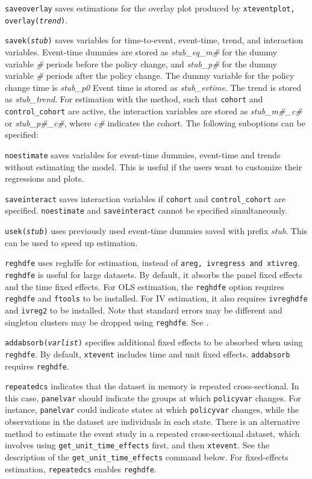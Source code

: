 \documentclass[bib]{./sty/statapress}
\begin{document}
\morehangpara
{\tt saveoverlay} saves estimations for the overlay plot produced by
            {\tt xteventplot, overlay({\it trend})}.

\hangpara
{\tt savek({\it stub})} saves variables for time-to-event, event-time, trend, and interaction variables.
Event-time dummies are stored as {\it stub\_eq\_m\#} for the dummy variable {\it \#} periods before the policy change, and {\it stub\_p\#} for the dummy variable {\it \#} periods after the policy change.
The dummy variable for the policy change time is {\it stub\_p0}
 Event time is stored as {\it stub\_evtime}. The trend is stored as {\it stub\_trend}.
For estimation with the \citet{sun2021estimating} method, such that {\tt cohort} and {\tt control\_cohort} are active, the interaction variables are stored as {\it stub\_m\#\_c\#} or {\it stub\_p\#\_c\#}, where {\it c\#} indicates the cohort.
The following suboptions can be specified:

\morehangpara
{\tt noestimate} saves variables for event-time dummies, event-time and trends without estimating the model. This is useful if the users want to customize their regressions and plots.

\morehangpara
{\tt saveinteract} saves interaction variables if {\tt cohort} and {\tt control\_cohort} are specified. {\tt noestimate} and {\tt saveinteract} cannot be specified simultaneously.

\hangpara
{\tt usek({\it stub})} uses previously used event-time dummies saved with prefix {\it stub}. This can be used to speed up estimation.

\hangpara
{\tt reghdfe} uses reghdfe for estimation, instead of {\tt areg, ivregress and  xtivreg}.
{\tt reghdfe} is useful for large datasets.
By default, it absorbs the panel fixed effects and the time fixed effects.
For OLS estimation, the {\tt reghdfe} option requires {\tt reghdfe} and {\tt ftools} to be installed. For IV estimation, it also requires {\tt ivreghdfe} and {\tt ivreg2} to be installed.
Note that standard errors may be different and singleton clusters may be dropped using {\tt reghdfe}.
See \citet{Correia2017:HDFE}.

\hangpara
{\tt addabsorb({\it varlist})} specifies additional fixed effects to be absorbed when using {\tt reghdfe}.
By default, {\tt xtevent} includes time and unit fixed effects.
{\tt addabsorb} requires {\tt reghdfe}.

\hangpara
{\tt repeatedcs} indicates that the dataset in memory is repeated cross-sectional.
In this case, {\tt panelvar} should indicate the groups at which {\tt policyvar} changes.
For instance, {\tt panelvar} could indicate states at which {\tt policyvar} changes, while the observations in the dataset are individuals in each state.
There is an alternative method to estimate the event study in a repeated cross-sectional dataset, which involves using {\tt  get\_unit\_time\_effects} first, and then {\tt xtevent}.
See the description of the {\tt get\_unit\_time\_effects} command below.
For fixed-effects estimation, {\tt repeatedcs} enables {\tt reghdfe}.
\end{document}
